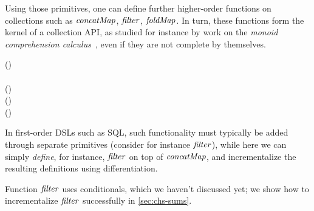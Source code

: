 Using those primitives, one can define further higher-order functions on
collections such as \ensuremath{\Varid{concatMap}}, \ensuremath{\Varid{filter}}, \ensuremath{\Varid{foldMap}}. In turn, these functions
form the kernel of a collection API, as studied for instance by work on the
\emph{monoid comprehension calculus}~\citep{Grust96Monoid,Fegaras95,Fegaras99},
even if they are not complete by themselves.
\begin{hscode}\SaveRestoreHook
{}%
%
\>[B]{}\mathrel{:\mkern-1mu:}(\to {}\;)\to {}\;\to {}\;\<[E]%
\\
\>[B]{}\;\mathrel{=}\;\<[E]%
\\[\blanklineskip]%
\>[B]{}\mathrel{:\mkern-1mu:}(\to {})\to {}\;\to {}\;\<[E]%
\\
\>[B]{}\;\mathrel{=}\;(\lambda {}\to {}\;\;\;\;\;\;\;){}\<[E]%
\\[\blanklineskip]%
\>[B]{}\mathrel{:\mkern-1mu:}\;\Rightarrow(\to {})\to {}\;\to {}\<[E]%
\\
\>[B]{}\;\mathrel{=}\;\<[E]%
\ColumnHook
\end{hscode}\resethooks
In first-order DSLs such as SQL, such functionality must typically be added through separate
primitives (consider for instance \ensuremath{\Varid{filter}}), while here we can simply
\emph{define}, for instance, \ensuremath{\Varid{filter}} on top of \ensuremath{\Varid{concatMap}}, and incrementalize
the resulting definitions using differentiation.

Function \ensuremath{\Varid{filter}} uses conditionals, which we haven't discussed yet; we show how
to incrementalize \ensuremath{\Varid{filter}} successfully in \cref{sec:chs-sums}.

